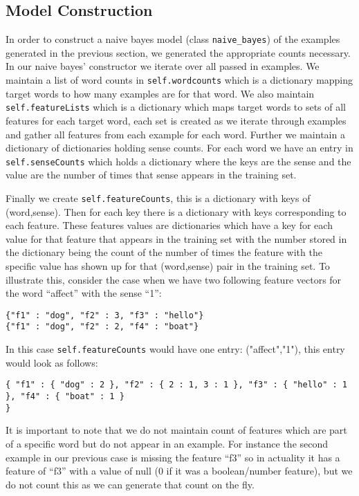\documentclass{article}
\begin{document}
\subsection{Model Construction}
In order to construct a naive bayes model (class \texttt{naive\_bayes}) of the examples generated in the previous section, we generated the appropriate counts necessary. In our naive bayes' constructor we iterate over all passed in examples. We maintain a list of word counts in \texttt{self.wordcounts} which is a dictionary mapping target words to how many examples are for that word. We also maintain \texttt{self.featureLists} which is a dictionary which maps target words to sets of all features for each target word, each set is created as we iterate through examples and gather all features from each example for each word. Further we maintain a dictionary of dictionaries holding sense counts. For each word we have an entry in \texttt{self.senseCounts} which holds a dictionary where the keys are the sense and the value are the number of times that sense appears in the training set. 

Finally we create \texttt{self.featureCounts}, this is a dictionary with keys of (word,sense). Then for each key there is a dictionary with keys corresponding to each feature. These features values are dictionaries which have a key for each value for that feature that appears in the training set with the number stored in the dictionary being the count of the number of times the feature with the specific value has shown up for that (word,sense) pair in the training set. To illustrate this, consider the case when we have two following feature vectors for the word ``affect'' with the sense ``1'':
{\small
\begin{verbatim}
{"f1" : "dog", "f2" : 3, "f3" : "hello"}
{"f1" : "dog", "f2" : 2, "f4" : "boat"}
\end{verbatim}
}
In this case \texttt{self.featureCounts} would have one entry: ("affect","1"), this entry would look as follows:
{\small
\begin{verbatim}
{ "f1" : { "dog" : 2 }, "f2" : { 2 : 1, 3 : 1 }, "f3" : { "hello" : 1 }, "f4" : { "boat" : 1 }
}
\end{verbatim}
}

It is important to note that we do not maintain count of features which are part of a specific word but do not appear in an example. For instance the second example in our previous case is missing the feature ``f3'' so in actuality it has a feature of ``f3'' with a value of null (0 if it was a boolean/number feature), but we do not count this as we can generate that count on the fly.
\end{document}

